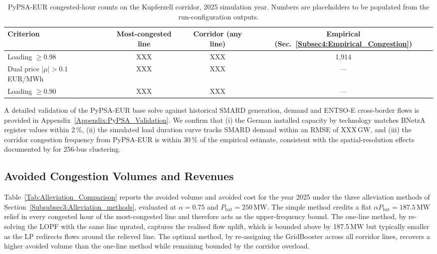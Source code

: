 \begin{table}[htbp]
\centering
\caption{PyPSA-EUR congested-hour counts on the Kupferzell corridor, 2025 simulation year. Numbers are placeholders to be populated from the run-configuration outputs.}
\label{Tab:PyPSA_Congestion_Summary}
\small
\begin{tabular}{lccc}
\toprule
Criterion & Most-congested line & Corridor (any line) & Empirical (Sec.~\ref{Subsec4:Empirical_Congestion}) \\
\midrule
Loading $\geq 0.98$           & XXX & XXX & 1{,}914 \\
Dual price $|\mu|>0.1$ EUR/MWh & XXX & XXX & --- \\
Loading $\geq 0.90$           & XXX & XXX & --- \\
\bottomrule
\end{tabular}
\end{table}
 
 
A detailed validation of the PyPSA-EUR base solve against historical SMARD generation, demand and ENTSO-E cross-border flows is provided in Appendix~\ref{Appendix:PyPSA_Validation}. We confirm that (i) the German installed capacity by technology matches BNetzA register values within 2\,\%, (ii) the simulated load duration curve tracks SMARD demand within an RMSE of XXX\,GW, and (iii) the corridor congestion frequency from PyPSA-EUR is within 30\,\% of the empirical estimate, consistent with the spatial-resolution effects documented by \citet{Frysztacki_2020_Modeling_Curtailment_Germany} for 256-bus clustering.

\subsection{Avoided Congestion Volumes and Revenues}\label{Subsec4:TSO_Revenues}
 
Table~\ref{Tab:Alleviation_Comparison} reports the avoided volume and avoided cost for the year 2025 under the three alleviation methods of Section~\ref{Subsubsec3:Alleviation_methods}, evaluated at $\alpha = 0.75$ and $P_{\mathrm{bat}} = 250$\,MW. The simple method credits a flat $\alpha P_{\mathrm{bat}} = 187.5$\,MW relief in every congested hour of the most-congested line and therefore acts as the upper-frequency bound. The one-line method, by re-solving the LOPF with the same line uprated, captures the realised flow uplift, which is bounded above by 187.5\,MW but typically smaller as the LP redirects flows around the relieved line. The optimal method, by re-assigning the GridBooster across all corridor lines, recovers a higher avoided volume than the one-line method while remaining bounded by the corridor overload.
 
